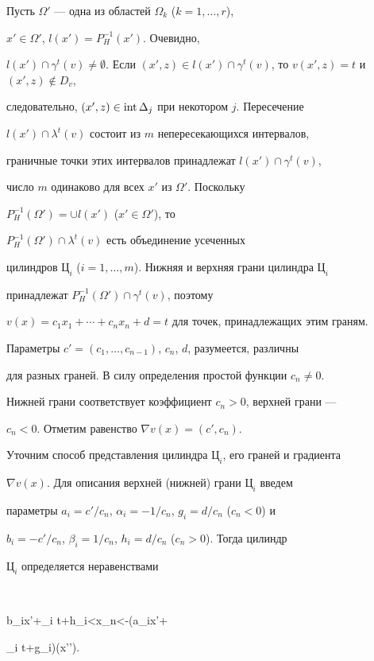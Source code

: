  


Пусть $\Omega'$ --- одна из областей $\Omega_k$ ($k=1,\dotsc,r$), 


$x'\in\Omega'$, $l(x')=P^{-1}_H(x')$. Очевидно, 


$l(x')\cap\gamma^t(v)\ne\emptyset$. Если $(x',z)\in 


l(x')\cap\gamma^t(v)$, то $v(x',z)=t$ и $(x',z)\notin D_v$, 


следовательно, $(x',z)\in\operatorname{int}\Delta_j$ при некотором $j$. Пересечение 


$l(x')\cap\lambda^t(v)$ состоит из $m$ непересекающихся интервалов, 


граничные точки этих интервалов принадлежат $l(x')\cap\gamma^t(v)$, 


число $m$ одинаково для всех $x'$ из $\Omega'$. Поскольку 


$P^{-1}_H(\Omega')=\cup l(x')$ ($x'\in\Omega'$), то 


$P^{-1}_H(\Omega')\cap\lambda^t(v)$ есть объединение усеченных 


цилиндров $Ц_i$ ($i=1,\dotsc,m$). Нижняя и верхняя грани цилиндра $Ц_i$ 


принадлежат $P^{-1}_H(\Omega')\cap\gamma^t(v)$, поэтому 


$v(x)=c_1x_1+\dotsb+c_n x_n+d=t$ для точек, принадлежащих этим граням. 


Параметры $c'=(c_1,\dotsc,c_{n-1})$, $c_n$, $d$, разумеется, различны 


для разных граней. В силу определения простой функции $c_n\ne 0$. 


Нижней грани соответствует коэффициент $c_n>0$, верхней грани --- 


$c_n<0$. Отметим равенство $\nabla v(x)=(c',c_n)$. 


 


Уточним способ представления цилиндра $Ц_i$, его граней и градиента 


$\nabla v(x)$. Для описания верхней (нижней) грани $Ц_i$ введем 


параметры $a_i=c'/c_n$, $\alpha_i=-1/c_n$, $g_i=d/c_n$ ($c_n<0$) и 


$b_i=-c'/c_n$, $\beta_i=1/c_n$, $h_i=d/c_n$ ($c_n>0$). Тогда цилиндр 


$Ц_i$ определяется неравенствами 


$$ 


b_i\cdot x'+\beta_i t+h_i<x_n<-(a_i\cdot x'+ 


\alpha_i t+g_i)\quad (x'\in\Omega'). 


